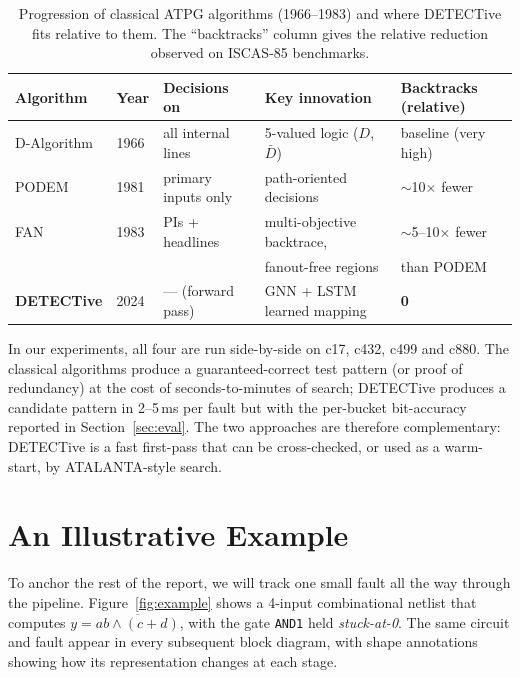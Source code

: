 \documentclass[11pt,a4paper]{article}
\newcommand{\code}[1]{\texttt{#1}}
\newcommand{\bd}[1]{\textbf{#1}}
\begin{document}
\begin{table}[htbp]
\centering
\caption{Progression of classical ATPG algorithms (1966--1983) and
where DETECTive fits relative to them. The ``backtracks'' column gives
the relative reduction observed on ISCAS-85 benchmarks.}
\label{tab:atpg-progression}
\small
\begin{tabular}{@{}lllll@{}}
\toprule
\bd{Algorithm} & \bd{Year} & \bd{Decisions on}      & \bd{Key innovation}             & \bd{Backtracks (relative)} \\
\midrule
D-Algorithm    & 1966      & all internal lines      & 5-valued logic ($D$, $\bar D$)  & baseline (very high)       \\
PODEM          & 1981      & primary inputs only     & path-oriented decisions         & $\sim$10$\times$ fewer     \\
FAN            & 1983      & PIs + headlines         & multi-objective backtrace,      & $\sim$5--10$\times$ fewer  \\
               &           &                         & fanout-free regions             & than PODEM                 \\
\bd{DETECTive} & 2024      & --- (forward pass)      & GNN + LSTM learned mapping      & \bd{0}                     \\
\bottomrule
\end{tabular}
\end{table}

In our experiments, all four are run side-by-side on c17, c432,
c499 and c880. The classical algorithms produce a guaranteed-correct
test pattern (or proof of redundancy) at the cost of seconds-to-minutes
of search; DETECTive produces a candidate pattern in
2--5\,ms per fault but with the per-bucket bit-accuracy reported in
Section~\ref{sec:eval}. The two approaches are therefore complementary:
DETECTive is a fast first-pass that can be cross-checked, or used as a
warm-start, by ATALANTA-style search.

\section{An Illustrative Example}
\label{sec:example}

To anchor the rest of the report, we will track one small fault all the
way through the pipeline. Figure~\ref{fig:example} shows a 4-input
combinational netlist that computes $y = \overline{ab \wedge (c+d)}$,
with the gate \code{AND1} held \emph{stuck-at-0}. The same circuit and
fault appear in every subsequent block diagram, with shape annotations
showing how its representation changes at each stage.
\end{document}

